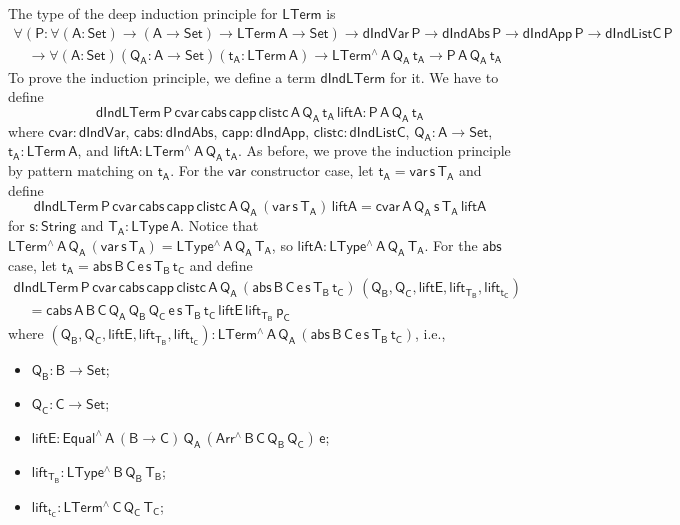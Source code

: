 \documentclass[9pt]{entcs} \usepackage{entcsmacro}
\begin{document}
The type of the deep induction principle for $\mathsf{LTerm}$ is
\[
\begin{array}{l}
\mathsf{\forall (P : \forall (A : Set) \to (A \to Set) \to LTerm\,A \to Set)
  \to dIndVar\,P \to dIndAbs\,P \to dIndApp\,P \to dIndListC\,P} \\
\quad \mathsf{\to \forall (A : Set)(Q_A : A \to Set)(t_A : LTerm\,A) \to LTerm^{\wedge}\,A\,Q_A\,t_A \to P\,A\,Q_A\,t_A}
\end{array}
\]
To prove the induction principle, we define a term $\mathsf{dIndLTerm}$ for it.
We have to define 
\[ 
\mathsf{dIndLTerm \, P\, cvar \, cabs\, capp\, clistc \, A\, Q_A\, t_A\, liftA : P\, A\, Q_A\, t_A}
\]
where $\mathsf{cvar: dIndVar}$, $\mathsf{cabs: dIndAbs}$, $\mathsf{capp : dIndApp}$, $\mathsf{clistc : dIndListC}$,
$\mathsf{Q_A : A \to Set}$, $\mathsf{t_A : LTerm\,A}$, and $\mathsf{liftA : LTerm^{\wedge}\,A\,Q_A\,t_A}$.
As before, we prove the induction principle by pattern matching on $\mathsf{t_A}$. 
For the $\mathsf{var}$ constructor case, let $\mathsf{t_A = var\, s\, T_A}$ and define
\[
  \mathsf{dIndLTerm \, P\, cvar \, cabs\, capp\, clistc \, A\, Q_A\, (var\,s\,T_A) \, liftA = cvar \, A\, Q_A\, s\, T_A\, liftA }
\]
for $\mathsf{s : String}$ and $\mathsf{T_A : LType\,A}$.
Notice that $\mathsf{LTerm^{\wedge}\, A\, Q_A\, (var\,s\,T_A) = LType^{\wedge}\,A\,Q_A\,T_A}$, so 
$\mathsf{liftA : LType^{\wedge}\,A\,Q_A\,T_A}$.
%
For the $\mathsf{abs}$ case, let $\mathsf{t_A = abs \,B \,C \, e \,s \,T_B \, t_C} $ and define
\[
\begin{array}{l}
\mathsf{dIndLTerm \, P\, cvar \, cabs\, capp\, clistc \, A\, Q_A\, (abs \,B \,C \,e \,s \,T_B \, t_C) \, (Q_B , Q_C , liftE, lift_{T_B}, lift_{t_C})} \\
\quad \mathsf{= cabs\,A\,B\,C\, Q_A\, Q_B\, Q_C\, e\, s\, T_B\, t_C\, liftE\, lift_{T_B}\, p_C}
\end{array}
\]
where $\mathsf{(Q_B , Q_C , liftE, lift_{T_B}, lift_{t_C}) : LTerm^{\wedge}\, A\, Q_A\, (abs \,B \,C \, e \,s \,T_B \, t_C)}$, i.e.,
\begin{itemize}
  \item $\mathsf{Q_B : B \to Set}$;
  \item $\mathsf{Q_C : C \to Set}$;
  \item $\mathsf{liftE : Equal^{\wedge} \, A\, (B \to C)\, Q_A\, (Arr^{\wedge} \, B\, C\, Q_B \, Q_C) \, e}$;
  \item $\mathsf{lift_{T_B}: LType^{\wedge} \, B\, Q_B\, T_B}$;
  \item $\mathsf{lift_{t_C}: LTerm^{\wedge} \, C\, Q_C\, T_C}$;
\end{itemize}
\end{document}
